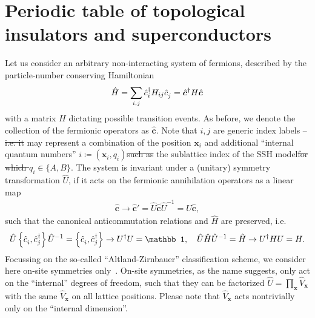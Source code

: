 \documentclass{svmono}
\def\pdag{{\vphantom\dag}}
\newcommand{\anticommutator}[1]{\left\{ #1 \right\}}
\providecommand{\DIFaddtex}[1]{{\protect\color{blue}\uwave{#1}}} %
\providecommand{\DIFdeltex}[1]{{\protect\color{red}\sout{#1}}}                      %
\providecommand{\DIFaddbegin}{} %
\providecommand{\DIFaddend}{} %
\providecommand{\DIFdelbegin}{} %
\providecommand{\DIFdelend}{} %
\providecommand{\DIFadd}[1]{\texorpdfstring{\DIFaddtex{#1}}{#1}} %
\providecommand{\DIFdel}[1]{\texorpdfstring{\DIFdeltex{#1}}{}} %
\newcommand{\DIFscaledelfig}{0.5}
\newlength{\DIFdelgraphicswidth} %
\newlength{\DIFdelgraphicsheight} %
\newcommand{\DIFaddincludegraphics}[2][]{{\color{blue}\fbox{\DIFOincludegraphics[#1]{#2}}}} %
\newcommand{\DIFdelincludegraphics}[2][]{%
\sbox{\DIFdelgraphicsbox}{\DIFOincludegraphics[#1]{#2}}%
\settoboxwidth{\DIFdelgraphicswidth}{\DIFdelgraphicsbox} %
\settoboxtotalheight{\DIFdelgraphicsheight}{\DIFdelgraphicsbox} %
\scalebox{\DIFscaledelfig}{%
\parbox[b]{\DIFdelgraphicswidth}{\usebox{\DIFdelgraphicsbox}\\[-\baselineskip] \rule{\DIFdelgraphicswidth}{0em}}\llap{\resizebox{\DIFdelgraphicswidth}{\DIFdelgraphicsheight}{%
\setlength{\unitlength}{\DIFdelgraphicswidth}%
\begin{picture}(1,1)%
\thicklines\linethickness{2pt} %
{\color[rgb]{1,0,0}\put(0,0){\framebox(1,1){}}}%
{\color[rgb]{1,0,0}\put(0,0){\line( 1,1){1}}}%
{\color[rgb]{1,0,0}\put(0,1){\line(1,-1){1}}}%
\end{picture}%
}\hspace*{3pt}}} %
} %
\DeclareRobustCommand{\DIFaddbegin}{\DIFOaddbegin \let\includegraphics\DIFaddincludegraphics} %
\DeclareRobustCommand{\DIFaddend}{\DIFOaddend \let\includegraphics\DIFOincludegraphics} %
\DeclareRobustCommand{\DIFdelbegin}{\DIFOdelbegin \let\includegraphics\DIFdelincludegraphics} %
\DeclareRobustCommand{\DIFdelend}{\DIFOaddend \let\includegraphics\DIFOincludegraphics} %
\begin{document}
\section{Periodic table of topological insulators and superconductors}
\label{sec:Periodic_table_of_topological_insulators_and_superconductors}
Let us consider an arbitrary non-interacting system of fermions, described by the particle-number conserving Hamiltonian
\begin{align}
    \hat H = \sum_{i,j}\hat c^\dag_{i}H_{ij}\hat c^\pdag_j = \hat{\bm c}^\dag H \hat{\bm c}^\pdag
\end{align}
with a matrix $H$ dictating possible transition events.
As before, we denote the collection of the fermionic operators as $\hat{\bm c}$.
Note that $i,j$ are generic index labels -- \DIFdelbegin \DIFdel{i.e. it }\DIFdelend \DIFaddbegin \DIFadd{they }\DIFaddend may represent a combination of the position $\bm x_i$ and additional ``internal quantum numbers'' $i\coloneqq(\bm x_i,q_i)$\DIFdelbegin \DIFdel{such as }\DIFdelend \DIFaddbegin \DIFadd{, e.g. }\DIFaddend the sublattice index \DIFaddbegin \DIFadd{$q_i\in \{A,B\}$ }\DIFaddend of the SSH model\DIFdelbegin \DIFdel{for which $q_i\in \{A,B\}$}\DIFdelend .
The system is invariant under a (unitary) symmetry transformation $\hat U$, if it acts on the fermionic annihilation operators as a linear map
\begin{align}
    \hat{\bm c}\rightarrow \hat{\bm c}' = \hat U \hat{\bm c} \hat U^{-1} = U \hat{\bm c},
\end{align}
such that the canonical anticommutation relations and $\hat H$ are preserved, i.e.
\begin{align}
    \hat U\anticommutator{\hat c_i^\pdag,\hat c_j^\dag}\hat U^{-1}
    =
    \anticommutator{\hat c_i^\pdag,\hat c_j^\dag}
    \rightarrow
    U^\dag U = \mathbb1
    ,\quad
    \hat U \hat H \hat U^{-1} = \hat H
    \rightarrow
    U^\dag H U = H
    .
\end{align}
Focussing on the so-called ``Altland-Zirnbauer'' classification scheme, we consider here on-site symmetries only~\cite{Altland1997}.
On-site symmetries, as the name suggests, only act on the ``internal'' degrees of freedom, such that they can be factorized $\hat U=\prod_{\bm x}\hat V_{\bm x}$ with the same $\hat V_{\bm x}$ on all lattice positions.
Please note that $\hat V_{\bm x}$ acts nontrivially only on the ``internal dimension''.
\end{document}
